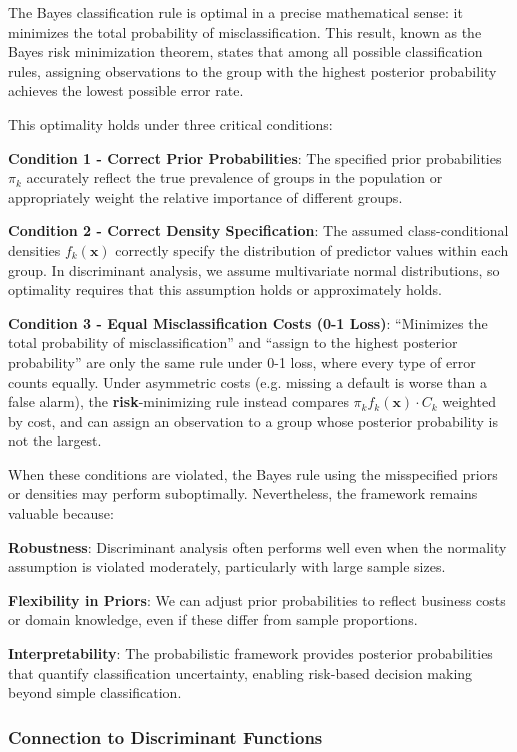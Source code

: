 \documentclass[
]{article}
\begin{document}
The Bayes classification rule is optimal in a precise mathematical
sense: it minimizes the total probability of misclassification. This
result, known as the Bayes risk minimization theorem, states that among
all possible classification rules, assigning observations to the group
with the highest posterior probability achieves the lowest possible
error rate.

This optimality holds under three critical conditions:

\textbf{Condition 1 - Correct Prior Probabilities}: The specified prior
probabilities \(\pi_{k}\) accurately reflect the true prevalence of
groups in the population or appropriately weight the relative importance
of different groups.

\textbf{Condition 2 - Correct Density Specification}: The assumed
class-conditional densities \(f_{k}\left( \mathbf{x} \right)\) correctly
specify the distribution of predictor values within each group. In
discriminant analysis, we assume multivariate normal distributions, so
optimality requires that this assumption holds or approximately holds.

\textbf{Condition 3 - Equal Misclassification Costs (0-1 Loss)}:
``Minimizes the total probability of misclassification'' and ``assign to
the highest posterior probability'' are only the same rule under 0-1
loss, where every type of error counts equally. Under asymmetric costs
(e.g. missing a default is worse than a false alarm), the
\textbf{risk}-minimizing rule instead compares
\(\pi_{k}f_{k}\left( \mathbf{x} \right) \cdot C_{k}\) weighted by cost,
and can assign an observation to a group whose posterior probability is
not the largest.

When these conditions are violated, the Bayes rule using the
misspecified priors or densities may perform suboptimally. Nevertheless,
the framework remains valuable because:

\textbf{Robustness}: Discriminant analysis often performs well even when
the normality assumption is violated moderately, particularly with large
sample sizes.

\textbf{Flexibility in Priors}: We can adjust prior probabilities to
reflect business costs or domain knowledge, even if these differ from
sample proportions.

\textbf{Interpretability}: The probabilistic framework provides
posterior probabilities that quantify classification uncertainty,
enabling risk-based decision making beyond simple classification.

\subsubsection{Connection to Discriminant Functions}
\end{document}
